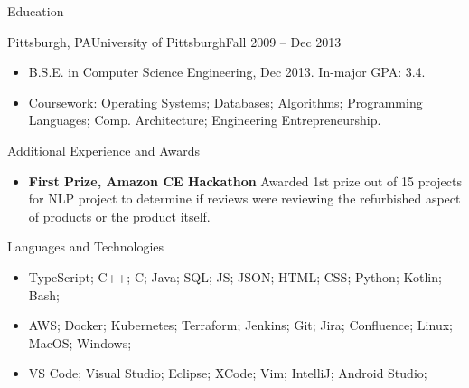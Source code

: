 \documentclass[]{mussocv}
\begin{document}
	\begin{cvsection}{Education}
		\begin{cvsubsection}{Pittsburgh, PA}{University of Pittsburgh}{Fall 2009 -- Dec 2013}
			\begin{itemize}
				\item B.S.E. in Computer Science Engineering, Dec 2013.  In-major GPA: 3.4.
				\item Coursework: Operating Systems; Databases; Algorithms; Programming Languages; Comp. Architecture; Engineering Entrepreneurship.
			\end{itemize}
		\end{cvsubsection}
	\end{cvsection}
	
	\begin{cvsection}{Additional Experience and Awards}
		\begin{cvsubsection}{}{}{}	
			\begin{itemize}
				\item \textbf{First Prize, Amazon CE Hackathon} Awarded 1st prize out of 15 projects for NLP project to determine if reviews were reviewing the refurbished aspect of products or the product itself.
			\end{itemize}
		\end{cvsubsection}
	\end{cvsection}
	
	\begin{cvsection}{Languages and Technologies}
		\begin{cvsubsection}{}{}{}	
			\begin{itemize}
				\item TypeScript; C++; C; Java; SQL; JS; JSON; HTML; CSS; Python; Kotlin; Bash;
				\item AWS; Docker; Kubernetes; Terraform; Jenkins; Git; Jira; Confluence; Linux; MacOS; Windows;
				\item VS Code; Visual Studio; Eclipse; XCode; Vim; IntelliJ; Android Studio;
			\end{itemize}
		\end{cvsubsection}
	\end{cvsection}
	
\end{document}
